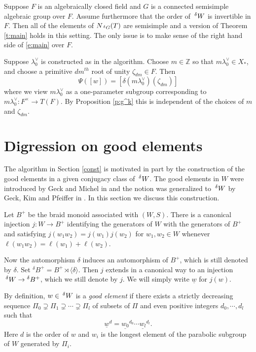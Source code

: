 \documentclass[10pt,leqno]{article}
\newcommand{\Z}{\mathbb Z}
\newcommand{\ch}[1]{#1^\vee}
\renewcommand{\sec}[1]{\section{#1}
\renewcommand{\theequation}{\thesection.\arabic{equation}}
  \setcounter{equation}{0}}
\newcommand{\Wext}{\negthinspace\negthinspace\phantom{a}^\delta W}
\newcommand{\Gext}{\negthinspace\negthinspace\phantom{a}^\delta G}
\renewcommand{\sec}[1]{\section{#1}
\renewcommand{\theequation}{\thesection.\arabic{equation}}
  \setcounter{equation}{0}}
\begin{document}
\begin{remarkplain}
\label{r:otherfield}
Suppose $F$ is an algebraically closed field and $G$ is a connected semisimple algebraic group over $F$. Assume furthermore that the order of $\Wext$ is invertible in $F$.
Then all of the elements of $N_{\Gext}(T)$ are semisimple
and a version of Theorem \ref{t:main} holds in this setting. The only issue is to make
sense of the right hand side of \eqref{e:main} over $F$. 

Suppose $\ch\lambda_0$ is constructed as in the algorithm. Choose $m\in\Z$ so that $m\ch\lambda_0\in X_*$,
and choose a primitive $dm^{th}$ root of unity $\zeta_{dm}\in F$. Then
$$
\Psi([w])=[\delta (m\ch\lambda_0)(\zeta_{dm})]
$$
where we view $m\ch\lambda_0$ as a one-parameter subgroup
corresponding to $m\ch\lambda_0:F^\times\rightarrow T(F)$. By
Proposition \ref{p:g^k} this is independent of the choices of $m$ and
$\zeta_{dm}$.

\end{remarkplain}


\sec{Digression on  good elements}
\label{s:digression}

The algorithm in Section \ref{const} is  motivated in part by
the construction of the good elements in a given conjugacy class of
$\Wext$.
The good elements in $W$ were introduced by Geck and Michel in
\cite{geck_michel_good} and the notion was generalized to $\Wext$ by Geck, Kim and
Pfeiffer in \cite{gkp}.
In this section we discuss this
construction.



Let $B^+$ be the braid monoid associated with $(W,S)$. There is a
canonical injection $j:W\longrightarrow B^+$ identifying the
generators of $W$ with the generators of $B^+$ and
satisfying $j(w_1w_2)=j(w_1)j(w_2)$ for $w_1,w_2\in W$ whenever
$\ell(w_1w_2)=\ell(w_1)+\ell(w_2)$.

Now the automorphism $\delta$ induces an automorphism of $B^+$, which
is still denoted by $\delta$. Set ${}^{\delta} B^+=B^+ \rtimes
\langle\delta\rangle$. Then $j$ extends in a canonical way to an
injection $\Wext \to {}^{\delta} B^+$, which we still denote by
$j$. We will simply write $\underline w$ for $j(w)$.

By definition, $w \in \Wext$ is a {\it good element} if there exists a
strictly decreasing sequence $\Pi_0 \supsetneq \Pi_1 \supsetneq \cdots
\supsetneq \Pi_l$ of subsets of $\Pi$ and even positive integers
$d_0,\cdots,d_l$ such
that $${\underline{w}}^d=\underline{w_0}^{d_0}\cdots\underline{w_l}^{d_l}.$$
Here $d$ is the order of $w$ and $w_i$ is the longest element of the
parabolic subgroup of $W$ generated by $\Pi_i$.
\end{document}
